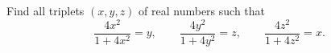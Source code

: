 Find all triplets $(x,y,z)$ of real numbers such that
$$\frac{4x^2}{1+4x^2}=y,\qquad \frac{4y^2}{1+4y^2}=z,\qquad \frac{4z^2}{1+4z^2}=x.$$
